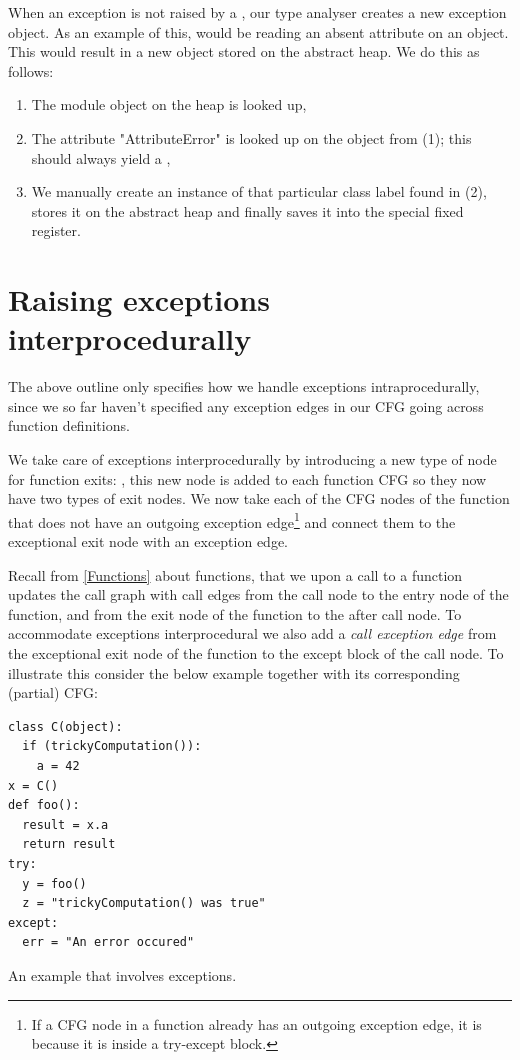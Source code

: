 When an exception is not raised by a , our type analyser creates a new exception object. As an example of this, would be reading an absent attribute on an object. This would result in a new  object stored on the abstract heap. We do this as follows:

\begin{enumerate}
	\item The  module object on the heap is looked up,
	\item The attribute "AttributeError" is looked up on the  object from (1); this should always yield a ,
	\item We manually create an instance of that particular class label found in (2), stores it on the abstract heap and finally saves it into the special fixed register.
\end{enumerate}


\section{Raising exceptions interprocedurally}
The above outline only specifies how we handle exceptions intraprocedurally, since we so far haven't specified any exception edges in our CFG going across function definitions.

We take care of exceptions interprocedurally by introducing a new type of node for function exits: , this new node is added to each function CFG so they now have two types of exit nodes. We now take each of the CFG nodes of the function that does not have an outgoing exception edge\footnote{If a CFG node in a function already has an outgoing exception edge, it is because it is inside a try-except block.} and connect them to the exceptional exit node with an exception edge.

Recall from \autoref{Functions} about functions, that we upon a call to a function updates the call graph with call edges from the call node to the entry node of the function, and from the exit node of the function to the after call node. To accommodate exceptions interprocedural we also add a \textit{call exception edge} from the exceptional exit node of the function to the except block of the call node. To illustrate this consider the below example together with its corresponding (partial) CFG:

\begin{listing}[H]
	\begin{verbatim}
class C(object):
  if (trickyComputation()):
    a = 42
x = C()
def foo():
  result = x.a
  return result
try:
  y = foo()
  z = "trickyComputation() was true"
except:
  err = "An error occured"
	\end{verbatim}
	\caption{An example that involves exceptions.}
	\label{code:NameExceptionExample}
\end{listing}

